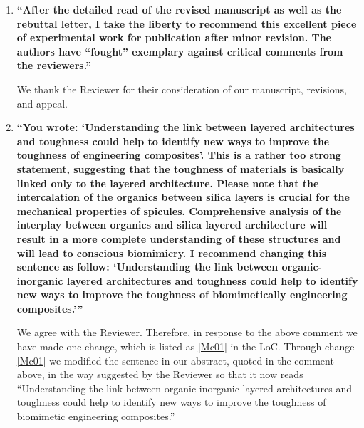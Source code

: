 \documentclass[11pt,letterpaper]{report}
\begin{document}
\begin{enumerate}[label=\textit{1.\arabic*},wide, labelwidth=!, labelindent=0pt]
\item \label{r4c1} {\bf ``After the detailed read of the revised manuscript as well as the rebuttal letter, I take the liberty to recommend this excellent piece of experimental work for publication after minor revision. The authors have ``fought'' exemplary against critical comments from the reviewers.''}

We thank the Reviewer for their consideration of our manuscript, revisions, and appeal.

\item \label{r4c2} {\bf ``You wrote: `Understanding the link between layered architectures and toughness could help to identify new ways to improve the toughness of engineering composites'.
This is a rather too strong statement, suggesting that the toughness of materials is basically linked only to the layered architecture. Please note that the intercalation of the organics between silica layers is crucial for the mechanical properties of spicules. Comprehensive analysis of the interplay between organics and silica layered architecture will result in a more complete understanding of these structures and will lead to conscious biomimicry. I recommend changing this sentence as follow: `Understanding the link between organic-inorganic layered architectures and toughness could help to identify new ways to improve the toughness of biomimetically engineering composites.'''}

We agree with the Reviewer. Therefore, in response to the above comment we have made one change, which is listed as \ref{Mc01} in the LoC. Through change \ref{Mc01} we modified the sentence in our abstract, quoted in the comment above, in the way suggested by the Reviewer  so that it now reads ``Understanding the link between organic-inorganic layered architectures and toughness could help to identify new ways to improve the toughness of biomimetic engineering composites.''


\end{enumerate}
\end{document}
